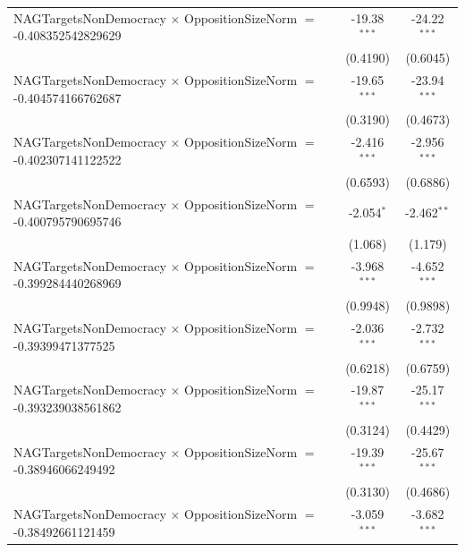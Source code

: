 \begin{tabular}{lcc}
   NAGTargetsNonDemocracy $\times$ OppositionSizeNorm $=$ -0.408352542829629    & -19.38$^{***}$       & -24.22$^{***}$\\   
                                                                                & (0.4190)             & (0.6045)\\   
   NAGTargetsNonDemocracy $\times$ OppositionSizeNorm $=$ -0.404574166762687    & -19.65$^{***}$       & -23.94$^{***}$\\   
                                                                                & (0.3190)             & (0.4673)\\   
   NAGTargetsNonDemocracy $\times$ OppositionSizeNorm $=$ -0.402307141122522    & -2.416$^{***}$       & -2.956$^{***}$\\   
                                                                                & (0.6593)             & (0.6886)\\   
   NAGTargetsNonDemocracy $\times$ OppositionSizeNorm $=$ -0.400795790695746    & -2.054$^{*}$         & -2.462$^{**}$\\   
                                                                                & (1.068)              & (1.179)\\   
   NAGTargetsNonDemocracy $\times$ OppositionSizeNorm $=$ -0.399284440268969    & -3.968$^{***}$       & -4.652$^{***}$\\   
                                                                                & (0.9948)             & (0.9898)\\   
   NAGTargetsNonDemocracy $\times$ OppositionSizeNorm $=$ -0.39399471377525     & -2.036$^{***}$       & -2.732$^{***}$\\   
                                                                                & (0.6218)             & (0.6759)\\   
   NAGTargetsNonDemocracy $\times$ OppositionSizeNorm $=$ -0.393239038561862    & -19.87$^{***}$       & -25.17$^{***}$\\   
                                                                                & (0.3124)             & (0.4429)\\   
   NAGTargetsNonDemocracy $\times$ OppositionSizeNorm $=$ -0.38946066249492     & -19.39$^{***}$       & -25.67$^{***}$\\   
                                                                                & (0.3130)             & (0.4686)\\   
   NAGTargetsNonDemocracy $\times$ OppositionSizeNorm $=$ -0.38492661121459     & -3.059$^{***}$       & -3.682$^{***}$\\   

\end{tabular}
